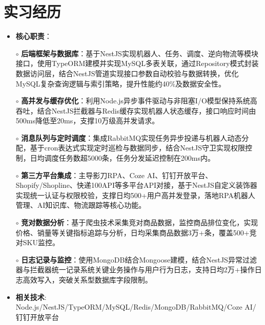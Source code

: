 \section{实习经历}
  \begin{normalsize}
    \begin{itemize}
    \item \textbf{核心职责}：
    \setlength{\itemindent}{1em} %
      \item[$\circ$] \textbf{后端框架与数据库}：基于NestJS实现机器人、任务、调度、逆向物流等模块接口，使用TypeORM建模并实现MySQL多表关联，通过Repository模式封装数据访问层，结合NestJS管道实现接口参数自动校验与数据转换，优化MySQL复杂查询逻辑与索引策略，提升性能约40\%及数据安全性。
      \item[$\circ$] \textbf{高并发与缓存优化}：利用Node.js异步事件驱动与非阻塞I/O模型保持系统高吞吐，结合NestJS拦截器与Redis缓存实现机器人状态缓存，接口响应时间由500ms降低至20ms，支撑10万级高并发请求。
      \item[$\circ$] \textbf{消息队列与定时调度}：集成RabbitMQ实现任务异步投递与机器人动态分配，基于cron表达式实现定时巡检与数据同步，结合NestJS守卫实现权限控制，日均调度任务数超5000条，任务分发延迟控制在200ms内。
      \item[$\circ$] \textbf{第三方平台集成}：主导影刀RPA、Coze AI、钉钉开放平台、Shopify/Shopline、快递100API等多平台API对接，基于NestJS自定义装饰器实现统一认证与权限校验，支撑日均500+用户高并发登录，落地RPA机器人管理、AI知识库、物流跟踪等核心功能。
      \item[$\circ$] \textbf{竞对数据分析}：基于爬虫技术采集竞对商品数据，监控商品排位变化，实现价格、销量等关键指标追踪与分析，日均采集商品数据3万+条，覆盖500+竞对SKU监控。
      \item[$\circ$] \textbf{日志记录与监控}：使用MongoDB结合Mongoose建模，结合NestJS异常过滤器与拦截器统一记录系统关键业务操作与用户行为日志，支持日均2万+操作日志高效写入，突破关系型数据库字段限制。
    \setlength{\itemindent}{0em} %
    \item \textbf{相关技术}: Node.js/NestJS/TypeORM/MySQL/Redis/MongoDB/RabbitMQ/Coze AI/钉钉开放平台
    \end{itemize}
  \end{normalsize}
